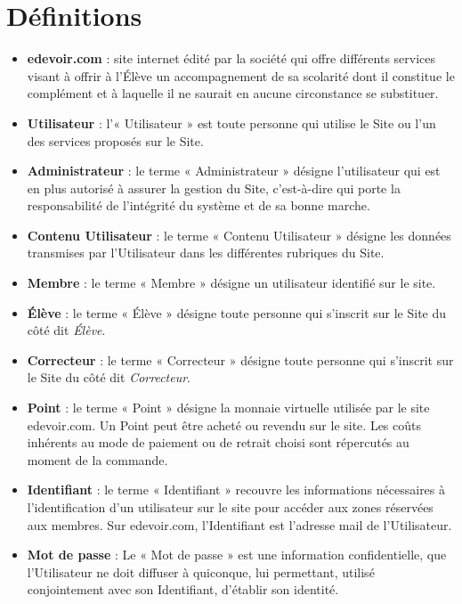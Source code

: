 \section{Définitions}

\begin{itemize}
  \item \textbf{edevoir.com} : site internet édité par la société \eDevoir qui offre différents services visant à offrir à l'Élève un accompagnement de sa scolarité dont il constitue le complément et à laquelle il ne saurait en aucune circonstance se substituer.

  \item \textbf{Utilisateur} : l'« Utilisateur » est toute personne qui utilise le Site ou l'un des services proposés sur le Site.

  \item \textbf{Administrateur} : le terme « Administrateur » désigne l'utilisateur qui est en plus autorisé à assurer la gestion du Site, c'est-à-dire qui porte la responsabilité de l'intégrité du système et de sa bonne marche.
  
  \item \textbf{Contenu Utilisateur} : le terme « Contenu Utilisateur » désigne les données transmises par l'Utilisateur dans les différentes rubriques du Site.

  \item \textbf{Membre} : le terme « Membre » désigne un utilisateur identifié sur le site.

  \item \textbf{Élève} : le terme « Élève » désigne toute personne qui s'inscrit sur le Site du côté dit \textit{Élève}.

  \item \textbf{Correcteur} : le terme « Correcteur » désigne toute personne qui s'inscrit sur le Site du côté dit \textit{Correcteur}.
  
  \item \textbf{Point} : le terme « Point » désigne la monnaie virtuelle utilisée par le site edevoir.com. Un Point peut être acheté ou revendu sur le site. Les coûts inhérents au mode de paiement ou de retrait choisi sont répercutés au moment de la commande.

  \item \textbf{Identifiant} : le terme « Identifiant » recouvre les informations nécessaires à l'identification d'un utilisateur sur le site pour accéder aux zones réservées aux membres. Sur edevoir.com, l'Identifiant est l'adresse mail de l'Utilisateur.

  \item \textbf{Mot de passe} : Le « Mot de passe » est une information confidentielle, que l'Utilisateur ne doit diffuser à quiconque, lui permettant, utilisé conjointement avec son Identifiant, d'établir son identité.
\end{itemize}


